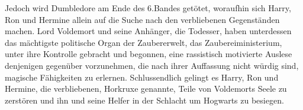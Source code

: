 Jedoch wird Dumbledore am Ende des 6.Bandes getötet, woraufhin sich Harry, Ron und Hermine allein auf die Suche nach den verbliebenen Gegenständen machen. Lord Voldemort und seine Anhänger, die Todesser, haben unterdessen das mächtigste politische Organ der Zaubererwelt, das Zaubereiministerium, unter ihre Kontrolle gebracht und begonnen, eine rassistisch motivierte \glqq Auslese\grqq{} denjenigen gegenüber vorzunehmen, die nach ihrer Auffassung nicht würdig sind, magische Fähigkeiten zu erlernen. 
Schlussendlich gelingt es Harry, Ron und Hermine, die verbliebenen, Horkruxe genannte, Teile von Voldemorts Seele zu zerstören und ihn und seine Helfer in der \glqq Schlacht um Hogwarts\grqq{} zu besiegen.
